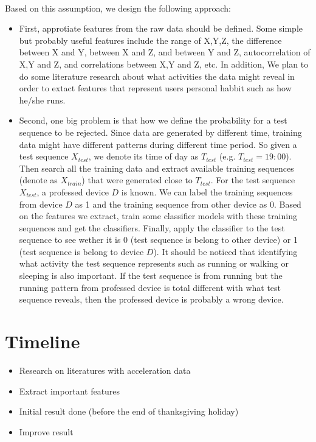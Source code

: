 \documentclass{article}
\begin{document}
	\paragraph{} Based on this assumption, we design the following approach:
	\begin{itemize}
		\item First, approtiate features from the raw data should be defined. Some simple but probably useful features include the range of X,Y,Z, the difference between X and Y, between X and Z, and between Y and Z, autocorrelation of X,Y and Z, and correlations between X,Y and Z, etc. In addition, We plan to do some literature research about what activities the data might reveal in order to extact features that represent users personal habbit such as how he/she runs. 
		\item Second, one big problem is that how we define the probability for a test sequence to be rejected. Since data are generated by different time, training data might have different patterns during different time period. So given a test sequence $X_{test}$, we denote its time of day as $T_{test}$ (e.g. $T_{test}=19:00$). Then search all the training data and extract available training sequences (denote as $X_{train}$) that were generated close to $T_{test}$. For the test sequence $X_{test}$, a professed device $D$ is known. We can label the training sequences from device $D$ as 1 and the training sequence from other device as 0. Based on the features we extract, train some classifier models with these training sequences and get the classifiers. Finally, apply the classifier to the test sequence to see wether it is 0 (test sequence is belong to other device) or 1 (test sequence is belong to device $D$). It should be noticed that identifying what activity the test sequence represents such as running or walking or sleeping is also important. If the test sequence is from running but the running pattern from professed device is total different with what test sequence reveals, then the professed device is probably a wrong device. 
		
	\end{itemize}
	
	\section{Timeline} %
	\label{sec:timeline}
	\begin{itemize}
		\item Research on literatures with acceleration data
		\item Extract important features 
		\item Initial result done (before the end of thanksgiving holiday)
		\item Improve result
	\end{itemize}
	
	
\end{document}
